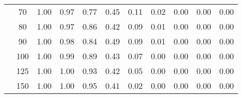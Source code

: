 \begin{table}[t]
\begin{center}
\begin{subtable}[c]{\textwidth}
\begin{center}
\begin{tabular}{rcccccccccc}
                                        & \multicolumn{1}{c|}{70}  & \num{1.00}  & \num{0.97}  & \num{0.77}  & \num{0.45}  & \num{0.11}  & \num{0.02}  & \num{0.00}  & \num{0.00}  & \num{0.00}  \\
                                        & \multicolumn{1}{c|}{80}  & \num{1.00}  & \num{0.97}  & \num{0.86}  & \num{0.42}  & \num{0.09}  & \num{0.01}  & \num{0.00}  & \num{0.00}  & \num{0.00}  \\
                                        & \multicolumn{1}{c|}{90}  & \num{1.00}  & \num{0.98}  & \num{0.84}  & \num{0.49}  & \num{0.09}  & \num{0.01}  & \num{0.00}  & \num{0.00}  & \num{0.00}  \\
                                        & \multicolumn{1}{c|}{100}  & \num{1.00}  & \num{0.99}  & \num{0.89}  & \num{0.43}  & \num{0.07}  & \num{0.00}  & \num{0.00}  & \num{0.00}  & \num{0.00}  \\
                                        & \multicolumn{1}{c|}{125}  & \num{1.00}  & \num{1.00}  & \num{0.93}  & \num{0.42}  & \num{0.05}  & \num{0.00}  & \num{0.00}  & \num{0.00}  & \num{0.00}  \\
                                        & \multicolumn{1}{c|}{150}  & \num{1.00}  & \num{1.00}  & \num{0.95}  & \num{0.41}  & \num{0.02}  & \num{0.00}  & \num{0.00}  & \num{0.00}  & \num{0.00}  \\
                                    \end{tabular}
            \end{center}
        \end{subtable}

        \vspace{5mm}


\end{center}
\end{table}
